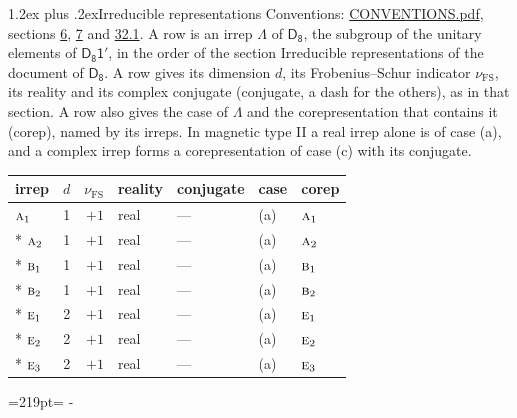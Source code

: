 \documentclass[10pt,a4paper]{article}
\makeatletter
\renewcommand\section{\@startsection{section}{1}{\z@}{-3ex plus -1ex minus -.2ex}%
  {1.2ex plus .2ex}{\normalfont\large\sffamily\bfseries\color{parttitle}}}
\newcommand{\needspace}[1]{\par\penalty-100\begingroup\dimen0=#1\relax\dimen2=\pagegoal
  \advance\dimen2-\pagetotal\ifdim\dimen0>\dimen2\relax\ifdim\dimen2>0pt\vfil\break\fi\fi
  \endgroup}
\numberwithin{equation}{section}
\newcommand{\grp}[1]{\mathsf{#1}}
\newcommand{\irr}[1]{\text{\normalfont\scshape #1}}
\newcommand{\fsind}{\nu_{\mathrm{FS}}}
\makeatother
\begin{document}
\section{Irreducible representations}\label{s:irreps}
Conventions: \href{../../CONVENTIONS.pdf}{CONVENTIONS.pdf}, sections \href{../../../rotation/CONVENTIONS.pdf\#conv.6}{6}, \href{../../../rotation/CONVENTIONS.pdf\#conv.7}{7} and \href{../../CONVENTIONS.pdf\#conv.32.1}{32.1}.
\leavevmode\label{n:irrep.Delta}A row is an irrep $\Lambda$ of $\grp{D_{8}}$, the subgroup of the unitary elements of $\grp{D_{8}1'}$, in the order of the section Irreducible representations of the document of \href{../../../rotation/data/pdf/D8.pdf}{$\grp{D_{8}}$}. \label{n:index.dimension}\label{n:index.frobenius}\label{n:head.irrep}\label{n:head.reality}\label{n:head.conjugate}A row gives its dimension $d$, its Frobenius--Schur indicator $\fsind$, its reality and its complex conjugate (conjugate, a dash for the others), as in that section. \label{n:head.case.corep}\label{n:head.corep}A row also gives the case of $\Lambda$ and the corepresentation that contains it (corep), named by its irreps. In magnetic type II a real irrep alone is of case (a), and a complex irrep forms a corepresentation of case (c) with its conjugate.
\setlength{\emergencystretch}{2em}\par\setlength{\emergencystretch}{0pt}
{\small\renewcommand{\arraystretch}{1.25}\setlength{\tabcolsep}{4pt}\begin{longtable}{@{}lrrllll@{}}\toprule
irrep & $d$ & $\fsind$ & reality & conjugate & case & corep\\\midrule\endhead
\bottomrule\endfoot\endlastfoot
$\irr{a}_{1}$ & 1 & $+1$ & real & --- & (a) & $\irr{a}_{1}$\\*
$\irr{a}_{2}$ & 1 & $+1$ & real & --- & (a) & $\irr{a}_{2}$\\*
$\irr{b}_{1}$ & 1 & $+1$ & real & --- & (a) & $\irr{b}_{1}$\\*
$\irr{b}_{2}$ & 1 & $+1$ & real & --- & (a) & $\irr{b}_{2}$\\*
$\irr{e}_{1}$ & 2 & $+1$ & real & --- & (a) & $\irr{e}_{1}$\\*
$\irr{e}_{2}$ & 2 & $+1$ & real & --- & (a) & $\irr{e}_{2}$\\*
$\irr{e}_{3}$ & 2 & $+1$ & real & --- & (a) & $\irr{e}_{3}$\\
\bottomrule\end{longtable}}
\needspace{219pt}
\end{document}

